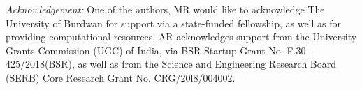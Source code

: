 \documentclass[%
reprint,
superscriptaddress,
amsmath,amssymb,
aps,
prb,
showkeys,
]{revtex4-2}
\begin{document}
	
	{\it Acknowledgement:}
	One of the authors, MR would like to acknowledge The University of Burdwan for support via a state-funded fellowship, as well as for providing computational resources. AR acknowledges support from the University Grants Commission (UGC) of India, via BSR Startup Grant No. F.30-425/2018(BSR), as well as from the Science and Engineering Research Board (SERB) Core Research Grant No. CRG/20l8/004002.
	
	
	
\end{document}
